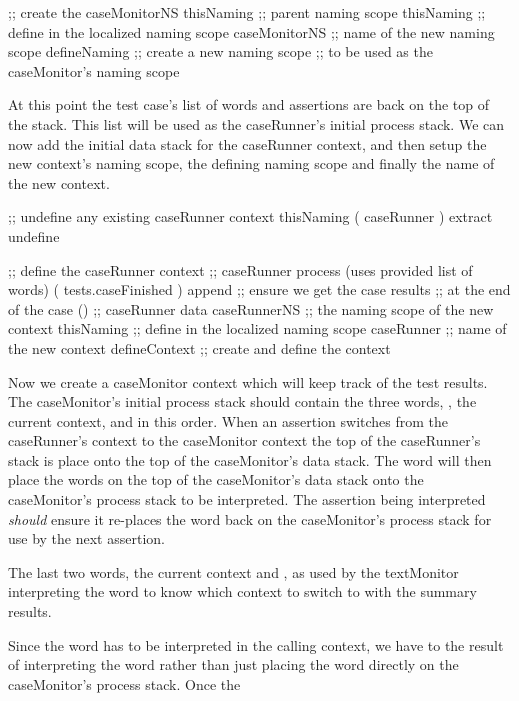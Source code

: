   ;; create the caseMonitorNS
  thisNaming    ;; parent naming scope
  thisNaming    ;; define in the localized naming scope
  caseMonitorNS ;; name of the new naming scope
  defineNaming  ;; create a new naming scope
                ;; to be used as the caseMonitor's naming scope
\stopJoylolCode

At this point the test case's list of words and assertions are back on the 
top of the stack. This list will be used as the caseRunner's initial 
process stack. We can now add the initial data stack for the caseRunner 
context, and then setup the new context's naming scope, the defining 
naming scope and finally the name of the new context.

\startJoylolCode
  ;; undefine any existing caseRunner context
  thisNaming
  ( caseRunner ) extract
  undefine

  ;; define the caseRunner context
                ;; caseRunner process (uses provided list of words)
  ( tests.caseFinished )
  append        ;; ensure we get the case results
                ;; at the end of the case
  ()            ;; caseRunner data
  caseRunnerNS  ;; the naming scope of the new context
  thisNaming    ;; define in the localized naming scope
  caseRunner    ;; name of the new context
  defineContext ;; create and define the context
\stopJoylolCode

Now we create a caseMonitor context which will keep track of the test 
results. The caseMonitor's initial process stack should contain the three 
words, , the current context, and  in this 
order. When an assertion switches from the caseRunner's context to the 
caseMonitor context the top of the caseRunner's stack is place onto the 
top of the caseMonitor's data stack. The  word will then 
place the words on the top of the caseMonitor's data stack onto the 
caseMonitor's process stack to be interpreted. The assertion being 
interpreted \emph{should} ensure it re-places the  word 
back on the caseMonitor's process stack for use by the next assertion. 

The last two words, the current context and , as used by the 
textMonitor interpreting the  word to know which context to 
switch to with the summary results. 

Since the  word has to be interpreted in the calling 
context, we have to  the result of interpreting the 
 word rather than just placing the  
word directly on the caseMonitor's process stack. Once the 

